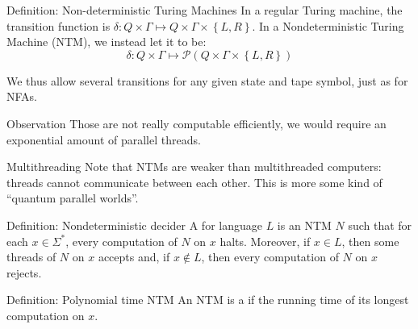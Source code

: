 \documentclass[a4paper]{article}
\begin{document}
\begin{parag}{Definition: Non-deterministic Turing Machines}
    In a regular Turing machine, the transition function is $\delta : Q \times \Gamma \mapsto Q \times \Gamma \times \left\{L, R\right\}$. In a Nondeterministic Turing Machine (NTM), we instead let it to be: 
    \[\delta: Q \times \Gamma \mapsto \mathcal{P}\left(Q \times \Gamma \times \left\{L, R\right\}\right)\]
    
    We thus allow several transitions for any given state and tape symbol, just as for NFAs.

    \begin{subparag}{Observation}
        Those are not really computable efficiently, we would require an exponential amount of parallel threads.
    \end{subparag}

    \begin{subparag}{Multithreading}
        Note that NTMs are weaker than multithreaded computers: threads cannot communicate between each other. This is more some kind of ``quantum parallel worlds''.
    \end{subparag}
\end{parag}

\begin{parag}{Definition: Nondeterministic decider}
    A  for language $L$ is an NTM $N$ such that for each $x \in \Sigma^*$, every computation of $N$ on $x$ halts. Moreover, if $x \in L$, then some threads of $N$ on $x$ accepts and, if $x \not \in L$, then every computation of $N$ on $x$ rejects.
\end{parag}

\begin{parag}{Definition: Polynomial time NTM}
    An NTM is a  if the running time of its longest computation on $x$.
\end{parag}
\end{document}
